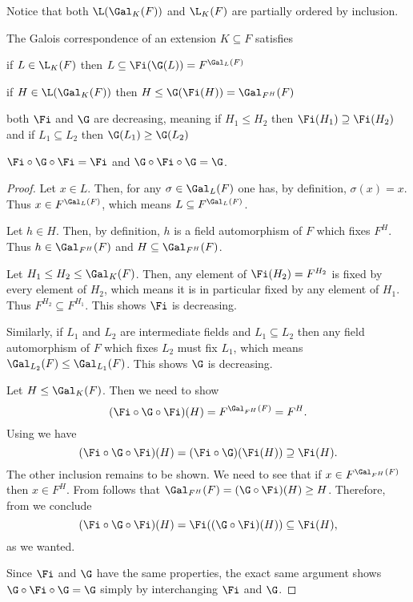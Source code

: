 \documentclass[12pt,oneside]{book}
\begin{document}
Notice that both \( \L(\Gal_K(F)) \) and \( \L_K(F) \) are partially ordered by
inclusion.

{\def\currentprefix{prop:properties of Galois correspondence}
\begin{proposition}
	The Galois correspondence of an extension \( K \subseteq F \) satisfies
	\begin{points}
	\item {} if \( L \in \L_K(F) \) then \( L \subseteq \Fi(\G(L)) =
		F^{\Gal_L(F)} \)
	\item {} if \( H \in \L(\Gal_K(F)) \) then \( H \leq \G(\Fi(H)) =
		\Gal_{F^H}(F) \)
	\item {} both \( \Fi \) and \( \G \) are decreasing, meaning if \( H_1 \leq
		H_2 \) then \( \Fi(H_1) \supseteq \Fi(H_2) \) and if \( L_1 \subseteq L_2 \) then \(
		\G(L_1) \geq \G(L_2) \)
	\item {} \( \Fi \circ \G \circ \Fi = \Fi \) and \( \G \circ \Fi \circ \G =
		\G \).
	\end{points}
\end{proposition}
\begin{proof}
	 Let \( x \in L \). Then, for any \( \sigma \in \Gal_L(F) \) one has, by
	definition, \( \sigma(x) = x \). Thus \( x \in F^{\Gal_L(F)} \), which means \( L
	\subseteq F^{\Gal_L(F)} \).

	 Let \( h \in H \). Then, by definition, \( h \) is a field automorphism of
	\( F \) which fixes \( F^H \). Thus \( h \in \Gal_{F^H}(F) \) and \( H \subseteq
	\Gal_{F^H}(F) \).

	 Let \( H_1 \leq H_2 \leq \Gal_K(F) \). Then, any element of \( \Fi(H_2) =
	F^{H_2}	\) is fixed by every element of \( H_2 \), which means it is in particular fixed
	by any element of \( H_1 \). Thus \( F^{H_2} \subseteq F^{H_1} \). This shows \( \Fi \)
	is decreasing. 

	Similarly, if \( L_1 \) and \( L_2 \) are intermediate fields and \( L_1 \subseteq L_2
	\) then any field automorphism of \( F \) which fixes \( L_2 \) must fix \( L_1 \),
	which means \( \Gal_{L_2}(F) \leq \Gal_{L_1}(F) \). This shows \( \G \) is decreasing.

	 Let \( H \leq \Gal_K(F) \). Then we need to show
	\begin{equation*}
		(\Fi \circ \G \circ \Fi)(H) = F^{\Gal_{F^H}(F)} = F^H.
	\end{equation*}
	Using  we have
	\begin{equation*}
		(\Fi \circ \G \circ \Fi)(H) = (\Fi \circ \G)(\Fi(H)) \supseteq \Fi(H).
	\end{equation*}
	The other inclusion remains to be shown. We need to see that if \( x \in
	F^{\Gal_{F^H}(F)} \) then \( x \in F^H \). From  follows that \(
	\Gal_{F^H}(F) = (\G \circ \Fi)(H) \geq H \). Therefore, from  we
	conclude 
	\begin{equation*}
		(\Fi \circ \G \circ \Fi)(H) = \Fi((\G \circ \Fi)(H)) \subseteq \Fi(H),
	\end{equation*}
	as we wanted.

	Since \( \Fi \) and \( \G \) have the same properties, the exact same argument shows \( \G
	\circ \Fi \circ \G = \G \) simply by interchanging \( \Fi \) and \( \G \).
\end{proof}
}
\end{document}
